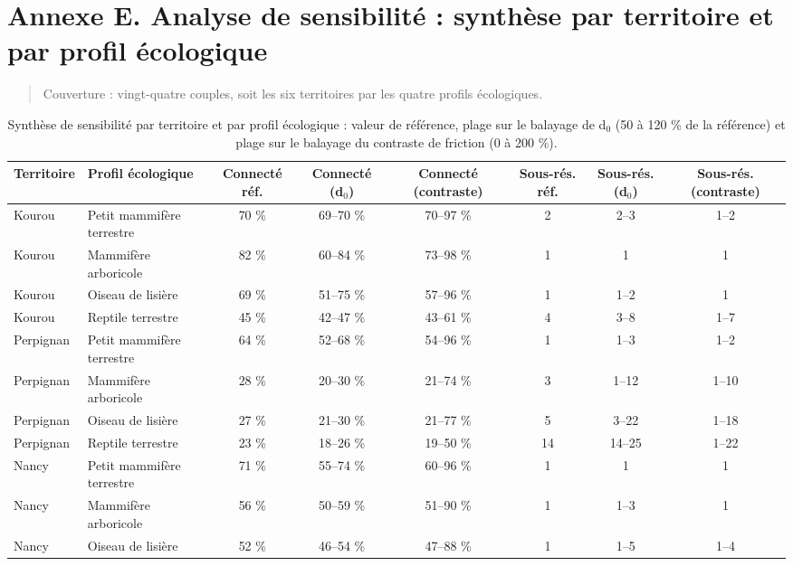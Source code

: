 \documentclass[a4paper,11pt]{report}
\begin{document}
\section{Annexe E. Analyse de sensibilité : synthèse par territoire et par profil écologique}\label{annexe:E}

\begin{quote}
Couverture : vingt-quatre couples, soit les six territoires par les quatre profils écologiques.
\end{quote}

\begin{landscape}
\begin{table}[H]
\centering
\footnotesize
\caption{Synthèse de sensibilité par territoire et par profil écologique : valeur de référence, plage sur le balayage de d$_{0}$ (50 à 120 \% de la référence) et plage sur le balayage du contraste de friction (0 à 200 \%).}
\begin{tabular}{llcccccc}
\toprule
\textbf{Territoire} & \textbf{Profil écologique} & \textbf{Connecté réf.} & \textbf{Connecté (d$_{0}$)} & \textbf{Connecté (contraste)} & \textbf{Sous-rés. réf.} & \textbf{Sous-rés. (d$_{0}$)} & \textbf{Sous-rés. (contraste)} \\
\midrule
Kourou & Petit mammifère terrestre & 70 \% & 69--70 \% & 70--97 \% & 2 & 2--3 & 1--2 \\
Kourou & Mammifère arboricole & 82 \% & 60--84 \% & 73--98 \% & 1 & 1 & 1 \\
Kourou & Oiseau de lisière & 69 \% & 51--75 \% & 57--96 \% & 1 & 1--2 & 1 \\
Kourou & Reptile terrestre & 45 \% & 42--47 \% & 43--61 \% & 4 & 3--8 & 1--7 \\
Perpignan & Petit mammifère terrestre & 64 \% & 52--68 \% & 54--96 \% & 1 & 1--3 & 1--2 \\
Perpignan & Mammifère arboricole & 28 \% & 20--30 \% & 21--74 \% & 3 & 1--12 & 1--10 \\
Perpignan & Oiseau de lisière & 27 \% & 21--30 \% & 21--77 \% & 5 & 3--22 & 1--18 \\
Perpignan & Reptile terrestre & 23 \% & 18--26 \% & 19--50 \% & 14 & 14--25 & 1--22 \\
Nancy & Petit mammifère terrestre & 71 \% & 55--74 \% & 60--96 \% & 1 & 1 & 1 \\
Nancy & Mammifère arboricole & 56 \% & 50--59 \% & 51--90 \% & 1 & 1--3 & 1 \\
Nancy & Oiseau de lisière & 52 \% & 46--54 \% & 47--88 \% & 1 & 1--5 & 1--4 \\

\end{tabular}
\end{table}
\end{landscape}
\end{document}
